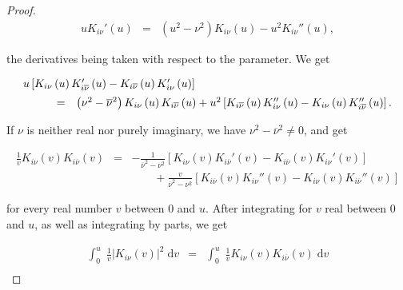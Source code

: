 \documentclass{jams-l}
\theoremstyle{definition}
\theoremstyle{remark}
\numberwithin{equation}{section}
\begin{document}
\begin{proof}
\[\begin{array}{lll}
                    u K_{i \nu}' \left( u \right) & = & \left( u^2 - \nu^2 \right) K_{i \nu} \left( u \right) - u^2 K_{i \nu}'' \left( u \right),
                \end{array} \]
            
            \noindent the derivatives being taken with respect to the parameter. We get
            
            \[ \begin{array}{lll}
                    \multicolumn{3}{l}{u \left[ K_{i \nu} \left( u \right) K_{i \overline{\nu}}' \left( u \right) -  K_{i \overline{\nu}} \left( u \right) K_{i \nu}' \left( u \right) \right]} \\[0.5em] 
                    
                    \qquad & = & \left( \nu^2 - \overline{\nu}^2 \right) K_{i \nu} \left( u \right) K_{i \overline{\nu}} \left( u \right) + u^2 \left[ K_{i \overline{\nu}} \left( u \right) K_{i \nu}'' \left( u \right) - K_{i \nu} \left( u \right) K_{i \overline{\nu}}'' \left( u \right) \right].
                \end{array} \]
            
            \noindent If $\nu$ is neither real nor purely imaginary, we have $\nu^2 - \overline{\nu}^2 \neq 0$, and get
            
            \[ \begin{array}{lll}
                    \frac{1}{v} K_{i \nu} \left( v \right) K_{i \overline{\nu}} \left( v \right) & = & - \frac{1}{\overline{\nu}^2 - \nu^2} \left[ K_{i \nu} \left( v \right) K_{i \overline{\nu}}' \left( v \right) -  K_{i \overline{\nu}} \left( v \right) K_{i \nu}' \left( v \right) \right] \\[0.5em]
                    
                    && \qquad + \frac{v}{\overline{\nu}^2 - \nu^2} \left[ K_{i \overline{\nu}} \left( v \right) K_{i \nu}'' \left( v \right) - K_{i \nu} \left( v \right) K_{i \overline{\nu}}'' \left( v \right) \right]
                \end{array} \]
            
            \noindent for every real number $v$ between $0$ and $u$. After integrating for $v$ real between $0$ and $u$, as well as integrating by parts, we get
            
            \begin{equation}
            \label{FormulaModifiedBesselAwayFromAxes}
                \begin{array}{lll}
                    \int_0^u \; \frac{1}{v} \left \vert K_{i \nu} \left( v \right) \right \vert^2 \; \mathrm{d}v & = & \int_0^u \; \frac{1}{v} K_{i \nu} \left( v \right) K_{i \overline{\nu}} \left( v \right) \; \mathrm{d}v \\[0.5em]
                    

\end{array}
\end{equation}
\end{proof}
\end{document}
